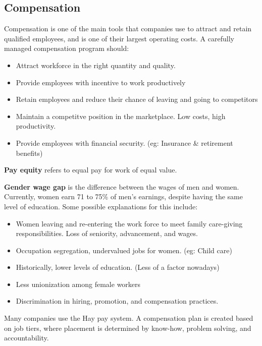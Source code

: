 \documentclass[english, 12pt]{article}
\begin{document}
\subsection{Compensation}
Compensation is one of the main tools that companies use to attract and retain qualified employees, and is one of their largest operating costs. A carefully managed compensation program should:
\begin{itemize}
\item Attract workforce in the right quantity and quality.
\item Provide employees with incentive to work productively
\item Retain employees and reduce their chance of leaving and going to competitors
\item Maintain a competitve position in the marketplace. Low costs, high productivity.
\item Provide employees with financial security. (eg: Insurance \& retirement benefits)
\end{itemize}
\begin{defn}
\textbf{Pay equity} refers to equal pay for work of equal value.
\end{defn}
\begin{defn}
\textbf{Gender wage gap} is the difference between the wages of men and women. Currently, women earn 71 to 75\% of men's earnings, despite having the same level of education. Some possible explanations for this include:
\begin{itemize}
\item Women leaving and re-entering the work force to meet family care-giving responsibilities. Loss of seniority, advancement, and wages.
\item Occupation segregation, undervalued jobs for women. (eg: Child care)
\item Historically, lower levels of education. (Less of a factor nowadays)
\item Less unionization among female workers
\item Discrimination in hiring, promotion, and compensation practices.
\end{itemize}
\end{defn}
\begin{exmp}
Many companies use the Hay pay system. A compensation plan is created based on job tiers, where placement is determined by know-how, problem solving, and accountability.
\end{exmp}
\end{document}
